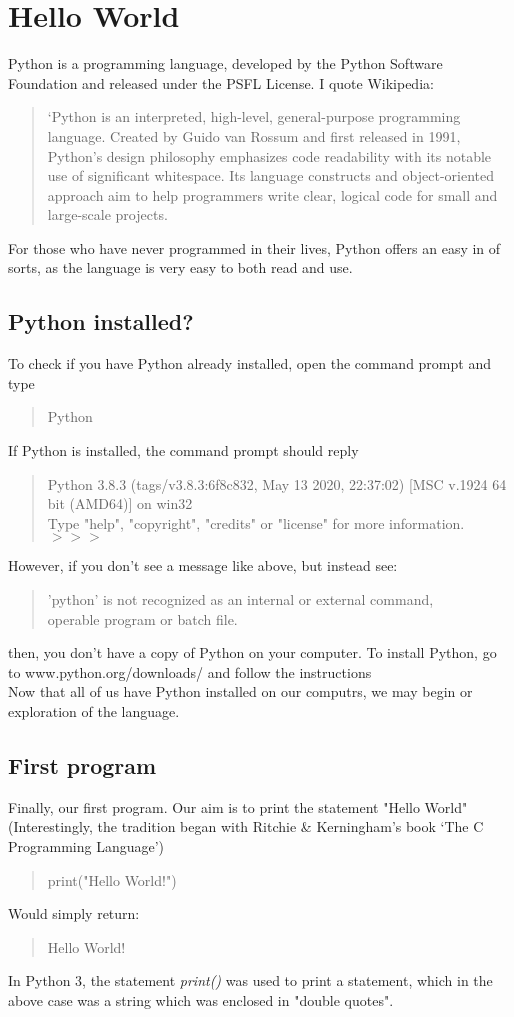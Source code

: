 \chapter{Hello World}
Python is a programming language, developed by the Python Software Foundation and released under the PSFL License. I quote Wikipedia: \begin{quotation}
`Python is an interpreted, high-level, general-purpose programming language. Created by Guido van Rossum and first released in 1991, Python's design philosophy emphasizes code readability with its notable use of significant whitespace. Its language constructs and object-oriented approach aim to help programmers write clear, logical code for small and large-scale projects.
\end{quotation}
For those who have never programmed in their lives, Python offers an easy in of sorts, as the language is very easy to both read and use.
\section{Python installed?}
To check if you have Python already installed, open the command prompt and type \begin{quote}
Python
\end{quote}
If Python is installed, the command prompt should reply
\begin{quote}
Python 3.8.3 (tags/v3.8.3:6f8c832, May 13 2020, 22:37:02) [MSC v.1924 64 bit (AMD64)] on win32\\
Type "help", "copyright", "credits" or "license" for more information.\\
$>>>$
\end{quote}
However, if you don't see a message like above, but instead see:
\begin{quote}
'python' is not recognized as an internal or external command,\\
operable program or batch file.
\end{quote}
then, you don't have a copy of Python on your computer.
To install Python, go to www.python.org/downloads/ and follow the instructions\\
Now that all of us have Python installed on our computrs, we may begin or exploration of the language.
\section{First program}
Finally, our first program. Our aim is to print the statement "Hello World" (Interestingly, the tradition began with Ritchie \& Kerningham's book `The C Programming Language')\begin{quote}
print("Hello World!")
\end{quote}
Would simply return:
\begin{quote}
Hello World!
\end{quote}
In Python 3, the statement \emph{print()} was used to print a statement, which in the above case was a string which was enclosed in "double quotes". 
